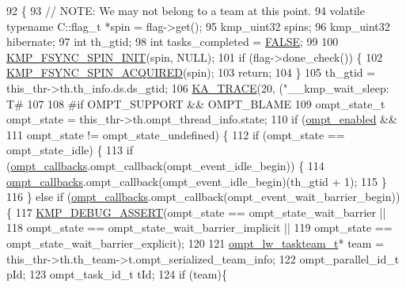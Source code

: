 \begin{DoxyCode}
92 \{
93     \textcolor{comment}{// NOTE: We may not belong to a team at this point.}
94     \textcolor{keyword}{volatile} \textcolor{keyword}{typename} C::flag\_t *spin = flag->get();
95     kmp\_uint32 spins;
96     kmp\_uint32 hibernate;
97     \textcolor{keywordtype}{int} th\_gtid;
98     \textcolor{keywordtype}{int} tasks\_completed = \hyperlink{kmp_8h_aa93f0eb578d23995850d61f7d61c55c1}{FALSE};
99 
100     \hyperlink{kmp__itt_8h_ae9ed9a1ec697c0049760eee81cf6521a}{KMP\_FSYNC\_SPIN\_INIT}(spin, NULL);
101     \textcolor{keywordflow}{if} (flag->done\_check()) \{
102         \hyperlink{kmp__itt_8h_a580841033d05175a7d1d36d91bdb9267}{KMP\_FSYNC\_SPIN\_ACQUIRED}(spin);
103         \textcolor{keywordflow}{return};
104     \}
105     th\_gtid = this\_thr->th.th\_info.ds.ds\_gtid;
106     \hyperlink{kmp__debug_8h_a21d51f37cb197aca5ffe737531678830}{KA\_TRACE}(20, (\textcolor{stringliteral}{"\_\_kmp\_wait\_sleep: T#%
107 
108 \textcolor{preprocessor}{#if OMPT\_SUPPORT && OMPT\_BLAME}
109 \textcolor{preprocessor}{}    ompt\_state\_t ompt\_state = this\_thr->th.ompt\_thread\_info.state;
110     \textcolor{keywordflow}{if} (\hyperlink{ompt-general_8c_a966b31b6d05f79f5495f8d8e71732f68}{ompt\_enabled} &&
111         ompt\_state != ompt\_state\_undefined) \{
112         \textcolor{keywordflow}{if} (ompt\_state == ompt\_state\_idle) \{
113             \textcolor{keywordflow}{if} (\hyperlink{ompt-general_8c_a84a29d89cef82c7c38e1ee1f70ec994f}{ompt\_callbacks}.ompt\_callback(ompt\_event\_idle\_begin)) \{
114                 \hyperlink{ompt-general_8c_a84a29d89cef82c7c38e1ee1f70ec994f}{ompt\_callbacks}.ompt\_callback(ompt\_event\_idle\_begin)(th\_gtid + 1);
115             \}
116         \} \textcolor{keywordflow}{else} \textcolor{keywordflow}{if} (\hyperlink{ompt-general_8c_a84a29d89cef82c7c38e1ee1f70ec994f}{ompt\_callbacks}.ompt\_callback(ompt\_event\_wait\_barrier\_begin)) \{
117             \hyperlink{kmp__debug_8h_ad766efc30e33e28634691088e80cdf08}{KMP\_DEBUG\_ASSERT}(ompt\_state == ompt\_state\_wait\_barrier ||
118                              ompt\_state == ompt\_state\_wait\_barrier\_implicit ||
119                              ompt\_state == ompt\_state\_wait\_barrier\_explicit);
120 
121             \hyperlink{structompt__lw__taskteam__s}{ompt\_lw\_taskteam\_t}* team = this\_thr->th.th\_team->t.ompt\_serialized\_team\_info;
122             ompt\_parallel\_id\_t pId;
123             ompt\_task\_id\_t tId;
124             \textcolor{keywordflow}{if} (team)\{
}
\end{DoxyCode}
